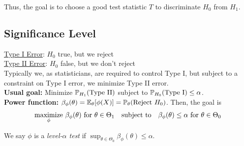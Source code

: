 Thus, the goal is to choose a good test statistic $T$ to discriminate $H_0$ from $H_1$.

\subsection*{Significance Level}
\sectionspace

\underline{Type I Error}: $H_0$ true, but we reject\\
\underline{Type II Error}: $H_0$ false, but we don't reject\\

Typically we, as statisticians, are required to control Type I, but subject to a constraint on Type I error, we minimize Type II error.\\

\textbf{Usual goal:} Minimize $\mathbb{P}_{H_1}(\text{Type II})$ subject to $\mathbb{P}_{H_0}(\text{Type I}) \leq \alpha$.\\

\textbf{Power function:} $\beta_{\phi}(\theta) = \mathbb{E}_{\theta}[\phi(X)] = \mathbb{P}_{\theta}(\text{Reject } H_0)$. Then, the goal is
\[ \underset{\phi}{\tt{maximize}}\ \beta_{\phi}(\theta) \tt{ for } \theta \in \Theta_1 \quad \tt{subject to} \quad \beta_{\phi}(\theta) \leq \alpha \tt{ for } \theta \in \Theta_0 \]

\begin{definition}
    We say $\phi$ is a \emph{level-$\alpha$ test} if $\sup_{\theta \in \Theta_0} \beta_{\phi}(\theta) \leq \alpha$.
\end{definition}
